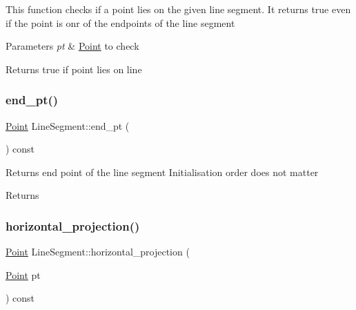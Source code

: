 This function checks if a point lies on the given line segment. It returns true even if the point is onr of the endpoints of the line segment 
\begin{DoxyParams}{Parameters}
{\em pt} & \hyperlink{classPoint}{Point} to check \\
\hline
\end{DoxyParams}
\begin{DoxyReturn}{Returns}
true if point lies on line 
\end{DoxyReturn}
\mbox{\label{classLineSegment_aa6c90340de500bb72bdde2114f838d57}} 
\subsubsection{\texorpdfstring{end\+\_\+pt()}{end\_pt()}}
{\footnotesize\ttfamily \hyperlink{classPoint}{Point} Line\+Segment\+::end\+\_\+pt (\begin{DoxyParamCaption}{ }\end{DoxyParamCaption}) const}

Returns end point of the line segment Initialisation order does not matter \begin{DoxyReturn}{Returns}

\end{DoxyReturn}
\mbox{\label{classLineSegment_a51a9d2fcca6b3ff03cb51fd4d8fae4ba}} 
\subsubsection{\texorpdfstring{horizontal\+\_\+projection()}{horizontal\_projection()}}
{\footnotesize\ttfamily \hyperlink{classPoint}{Point} Line\+Segment\+::horizontal\+\_\+projection (\begin{DoxyParamCaption}\item[{\hyperlink{classPoint}{Point}}]{pt }\end{DoxyParamCaption}) const}

